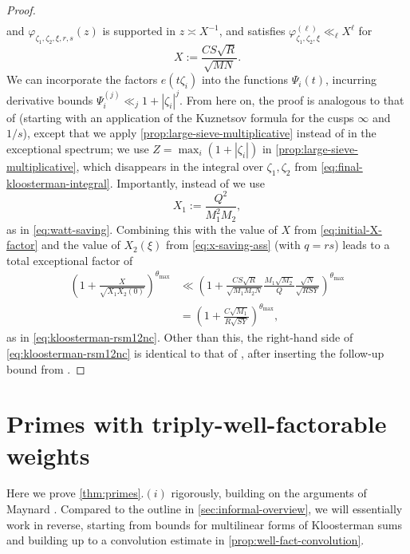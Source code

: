 \documentclass[reqno,11pt]{amsart}
\theoremstyle{remark}
\numberwithin{equation}{section}
\begin{document}
\begin{proof}
\[\begin{aligned}
\end{aligned}
\]
and $\varphi_{\zeta_1, \zeta_2, \xi, r, s}(z)$ is supported in $z \asymp X^{-1}$, and satisfies $\varphi_{\zeta_1,\zeta_2,\xi}^{(\ell)} \ll_\ell X^\ell$ for 
\begin{equation} \label{eq:initial-X-factor}
    X := \frac{CS\sqrt{R}}{\sqrt{MN}}.
\end{equation}
We can incorporate the factors $e(t \zeta_i)$ into the functions $\Psi_i(t)$, incurring derivative bounds $\Psi_i^{(j)} \ll_j 1 + |\zeta_i|^j$. From here on, the proof is analogous to that of \cite[Corollary 17]{pascadi2024large} (starting with an application of the Kuznetsov formula for the cusps $\infty$ and $1/s$), except that we apply \cref{prop:large-sieve-multiplicative} instead of \cite[Theorem J]{pascadi2024large} in the exceptional spectrum; we use $Z = \max_i(1 + |\zeta_i|)$ in \cref{prop:large-sieve-multiplicative}, which disappears in the integral over $\zeta_1, \zeta_2$ from \cref{eq:final-kloosterman-integral}. Importantly, instead of \cite[(5.33)]{pascadi2023smooth} we use
\[
    X_1 := \frac{Q^2}{M_1^2 M_2},
\]
as in \cref{eq:watt-saving}. Combining this with the value of $X$ from \cref{eq:initial-X-factor} and the value of $X_2(\xi)$ from \cref{eq:x-saving-ass} (with $q = rs$) leads to a total exceptional factor of
\[
\begin{aligned}
    \left(1 + \frac{X}{\sqrt{X_1 X_2(0)}}\right)^{\theta_{\max}}
    &\ll
    \left(1 + \frac{CS\sqrt{R}}{\sqrt{M_1 M_2 N}} \frac{M_1 \sqrt{M_2}}{Q} \frac{\sqrt{N}}{\sqrt{RSY}} \right)^{\theta_{\max}} 
    \\ 
    &= 
    \left(1 + \frac{C\sqrt{M_1}}{R\sqrt{SY}} \right)^{\theta_{\max}} ,
\end{aligned}
\]
as in \cref{eq:kloosterman-rsm12nc}.
Other than this, the right-hand side of \cref{eq:kloosterman-rsm12nc} is identical to that of \cite[(5.31)]{pascadi2024large}, after inserting the follow-up bound from \cite[(5.32)]{pascadi2024large}.
\end{proof}



\section{Primes with triply-well-factorable weights} \label{sec:primes} 
Here we prove \cref{thm:primes}.$(i)$ rigorously, building on the arguments of Maynard \cite{maynard2025primes2}. Compared to the outline in \cref{sec:informal-overview}, we will essentially work in reverse, starting from bounds for multilinear forms of Kloosterman sums and building up to a convolution estimate in \cref{prop:well-fact-convolution}.
\end{document}

